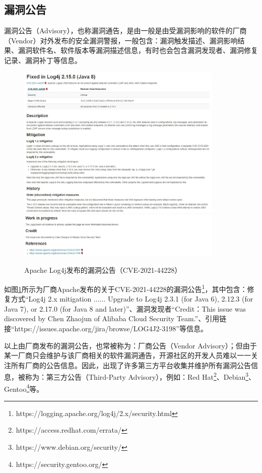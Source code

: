 \subsection{漏洞公告} 
漏洞公告（Advisory），也称漏洞通告，是由一般是由受漏洞影响的软件的厂商（Vendor）对外发布的安全漏洞警报，一般包含：漏洞触发描述、漏洞影响结果、漏洞软件名、软件版本等漏洞描述信息，有时也会包含漏洞发现者、漏洞修复记录、漏洞补丁等信息。

\begin{figure}[h]
    \centering
    \includegraphics[width=0.88\textwidth]{res/Vendor-2021-44228}
    \includegraphics[width=0.88\textwidth]{res/Vendor-2021-44228-2}
    \caption{Apache Log4j发布的漏洞公告（CVE-2021-44228）}
    \label{fig:Vendor-2021-44228}
\end{figure}

如图\ref{fig:Vendor-2021-44228}所示为厂商Apache发布的关于CVE-2021-44228的漏洞公告\footnote{https://logging.apache.org/log4j/2.x/security.html}，其中包含：修复方式“Log4j 2.x mitigation ...... Upgrade to Log4j 2.3.1 (for Java 6), 2.12.3 (for Java 7), or 2.17.0 (for Java 8 and later)”、漏洞发现者“Credit：This issue was discovered by Chen Zhaojun of Alibaba Cloud Security Team.”、引用链接“https://issues.apache.org/jira/browse/LOG4J2-3198”等信息。


以上由厂商发布的漏洞公告，也常被称为：厂商公告（Vendor Advisory）；但由于某一厂商只会维护与该厂商相关的软件漏洞通告，开源社区的开发人员难以一一关注所有厂商的公告信息。因此，出现了许多第三方平台收集并维护所有漏洞公告信息，被称为：第三方公告（Third-Party Advisory），例如：Red Hat\footnote{https://access.redhat.com/errata/}、Debian\footnote{https://www.debian.org/security/}、Gentoo\footnote{https://security.gentoo.org/}等。


